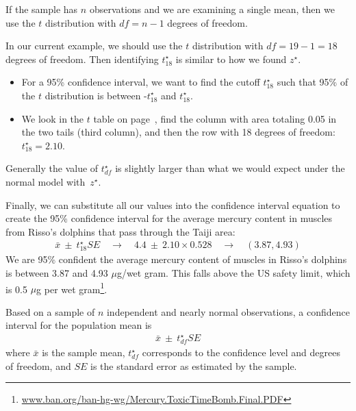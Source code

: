 \begin{termBox}{
If the sample has $n$ observations and we are examining a single mean, then we use the $t$ distribution with $df=n-1$ degrees of freedom.}
\end{termBox}

In our current example, we should use the $t$ distribution with $df=19-1=18$ degrees of freedom. Then identifying $t_{18}^{\star}$ is similar to how we found $z^{\star}$. 
\begin{itemize}
\setlength{\itemsep}{0mm}
\item For a 95\% confidence interval, we want to find the cutoff $t^{\star}_{18}$ such that 95\% of the $t$ distribution %
is between -$t^{\star}_{18}$ and $t^{\star}_{18}$.
\item We look in the $t$ table on page~\pageref{tTableSample}, find the column with area totaling 0.05 in the two tails (third column), and then the row with 18 degrees of freedom: $t^{\star}_{18} = 2.10$.
\end{itemize}
Generally the value of $t^{\star}_{df}$ is slightly larger than what we would expect under the normal model with~$z^{\star}$.



Finally, we can substitute all our values into the confidence interval equation to create the 95\% confidence interval for the average mercury content in muscles from Risso's dolphins that pass through the Taiji area:
\begin{eqnarray*}
\bar{x} \ \pm\  t^{\star}_{18}SE
	\quad \to \quad
4.4 \ \pm\  2.10 \times 0.528
	\quad \to \quad
(3.87, 4.93)
\end{eqnarray*}
We are 95\% confident the average mercury content of muscles in Risso's dolphins is between 3.87 and 4.93 $\mu$g/wet gram. This falls above the US safety limit, which is 0.5 $\mu$g per wet gram\footnote{\href{http://www.ban.org/ban-hg-wg/Mercury.ToxicTimeBomb.Final.PDF}{www.ban.org/ban-hg-wg/Mercury.ToxicTimeBomb.Final.PDF}}.

\begin{termBox}{
Based on a sample of $n$ independent and nearly normal observations, a confidence interval for the population mean is
\begin{eqnarray*}
\bar{x} \ \pm\  t^{\star}_{df}SE
\end{eqnarray*}
where $\bar{x}$ is the sample mean, $t^{\star}_{df}$ corresponds to the confidence level and degrees of freedom, and $SE$ is the standard error as estimated by the sample.}
\end{termBox}

